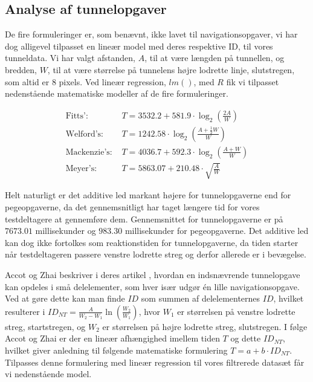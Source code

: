 \subsection*{Analyse af tunnelopgaver}
De fire formuleringer er, som benævnt, ikke lavet til navigationsopgaver, vi har dog alligevel tilpasset en lineær model med deres respektive ID, til vores tunneldata. Vi har valgt afstanden, $A$, til at være længden på tunnellen, og bredden, $W$, til at være størrelse på tunnelens højre lodrette linje, slutstregen, som altid er $8$ pixels. Ved lineær regression, $lm()$, med $R$ fik vi tilpasset nedenstående matematiske modeller af de fire formuleringer.

\begin{align*}
\text{Fitts': } &T = 3532.2 + 581.9\cdot \log_2\left(\frac{2A}{W}\right)\\
\text{Welford's: } &T =  1242.58\cdot \log_2\left(\frac{A+\frac{1}{2}W}{W}\right)\\
\text{Mackenzie's: } &T = 4036.7 + 592.3\cdot \log_2\left(\frac{A+W}{W}\right)\\
\text{Meyer's: } &T = 5863.07 + 210.48 \cdot \sqrt{\frac{A}{W}}
\end{align*}

Helt naturligt er det additive led markant højere for tunnelopgaverne end for pegeopgaverne, da det gennemsnitligt har taget længere tid for vores testdeltagere at gennemføre dem. Gennemsnittet for tunnelopgaverne er på $7673.01$ millisekunder og $983.30$ millisekunder for pegeopgaverne. Det additive led kan dog ikke fortolkes som reaktionstiden for tunnelopgaverne, da tiden starter når testdeltageren passere venstre lodrette streg og derfor allerede er i bevægelse.

Accot og Zhai beskriver i deres artikel \cite{accot1997}, hvordan en indsnævrende tunnelopgave kan opdeles i små delelementer, som hver især udgør én lille navigationsopgave. Ved at gøre dette kan man finde $ID$ som summen af delelementernes $ID$, hvilket resulterer i $ID_{NT} = \frac{A}{W_2-W_1}\ln\left(\frac{W_2}{W_1}\right)$, hvor $W_1$ er størrelsen på venstre lodrette streg, startstregen, og $W_2$ er størrelsen på højre lodrette streg, slutstregen. I følge Accot og Zhai er der en lineær afhængighed imellem tiden $T$ og dette $ID_{NT}$, hvilket giver anledning til følgende matematiske formulering $T = a+b\cdot ID_{NT}$. Tilpasses denne formulering med lineær regression til vores filtrerede datasæt får vi nedenstående model.

